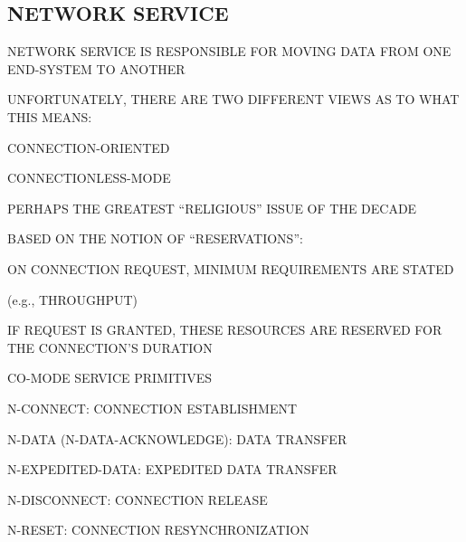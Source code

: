 \begin{bwslide}
\part*	{NETWORK SERVICE}\bf

\begin{nrtc}
\item	NETWORK SERVICE IS RESPONSIBLE FOR MOVING DATA FROM ONE END-SYSTEM
	TO ANOTHER

\item	UNFORTUNATELY, THERE ARE TWO DIFFERENT VIEWS AS TO WHAT THIS MEANS:
    \begin{nrtc}
    \item	CONNECTION-ORIENTED

    \item	CONNECTIONLESS-MODE
    \end{nrtc}

\item	PERHAPS THE GREATEST ``RELIGIOUS'' ISSUE OF THE DECADE
\end{nrtc}
\end{bwslide}


\begin{bwslide}

\begin{nrtc}
\item	BASED ON THE NOTION OF ``RESERVATIONS'':
    \begin{nrtc}
    \item	ON CONNECTION REQUEST, MINIMUM REQUIREMENTS ARE STATED
	\begin{nrtc}
	\item	(e.g., THROUGHPUT)
	\end{nrtc}

    \item	IF REQUEST IS GRANTED, THESE RESOURCES ARE RESERVED FOR THE
		CONNECTION'S DURATION
    \end{nrtc}

\item	CO-MODE SERVICE PRIMITIVES
    \begin{nrtc}
    \item	N-CONNECT: CONNECTION ESTABLISHMENT

    \item	N-DATA (N-DATA-ACKNOWLEDGE): DATA TRANSFER 

    \item	N-EXPEDITED-DATA: EXPEDITED DATA TRANSFER

    \item	N-DISCONNECT: CONNECTION RELEASE

    \item	N-RESET: CONNECTION RESYNCHRONIZATION
    \end{nrtc}
\end{nrtc}
\end{bwslide}


